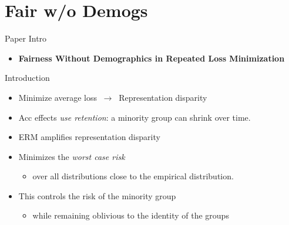 \documentclass{beamer}
\begin{document}
\section{Fair w/o Demogs}
\begin{viterbiframe}{{Paper Intro}}
\begin{itemize}
    \item {\bf Fairness Without Demographics in Repeated Loss Minimization}
\end{itemize}
\end{viterbiframe}

\begin{viterbiframe}{Introduction}
    \begin{itemize}
        \item Minimize average loss $~\rightarrow~$ Representation disparity
        \pause
        \item Acc effects \emph{use retention}: a minority group can shrink over time.
        \pause
        \item ERM amplifies representation disparity
        \pause
        \item Minimizes the \emph{worst case risk} 
        \pause
        \begin{itemize}
            \item[] over all distributions close to the empirical distribution.
        \end{itemize} 
        \pause
        \item This controls the risk of the minority group
        \pause
        \begin{itemize}
            \item[] while remaining oblivious to the identity of the groups
        \end{itemize} 
        
    \end{itemize}
    
\end{viterbiframe}
\end{document}
